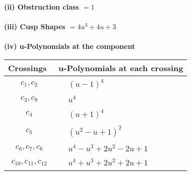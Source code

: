 \documentclass[1p]{elsarticle_modified}
\theoremstyle{definition}
\begin{document}
\flushleft \textbf{(ii) Obstruction class $= 1$}\\~\\
\flushleft \textbf{(iii) Cusp Shapes $= 4 u^3+4 u+3$}\\~\\
\newpage\renewcommand{\arraystretch}{1}
\flushleft \textbf{(iv) u-Polynomials at the component}\newline \\
\begin{tabular}{m{50pt}|m{274pt}}
Crossings & \hspace{64pt}u-Polynomials at each crossing \\
\hline $$\begin{aligned}c_{1},c_{2}\end{aligned}$$&$\begin{aligned}
&(u-1)^4
\end{aligned}$\\
\hline $$\begin{aligned}c_{3},c_{9}\end{aligned}$$&$\begin{aligned}
&u^4
\end{aligned}$\\
\hline $$\begin{aligned}c_{4}\end{aligned}$$&$\begin{aligned}
&(u+1)^4
\end{aligned}$\\
\hline $$\begin{aligned}c_{5}\end{aligned}$$&$\begin{aligned}
&(u^2- u+1)^2
\end{aligned}$\\
\hline $$\begin{aligned}c_{6},c_{7},c_{8}\end{aligned}$$&$\begin{aligned}
&u^4- u^3+2 u^2-2 u+1
\end{aligned}$\\
\hline $$\begin{aligned}c_{10},c_{11},c_{12}\end{aligned}$$&$\begin{aligned}
&u^4+u^3+2 u^2+2 u+1
\end{aligned}$\\
\hline
\end{tabular}\\~\\
\end{document}
